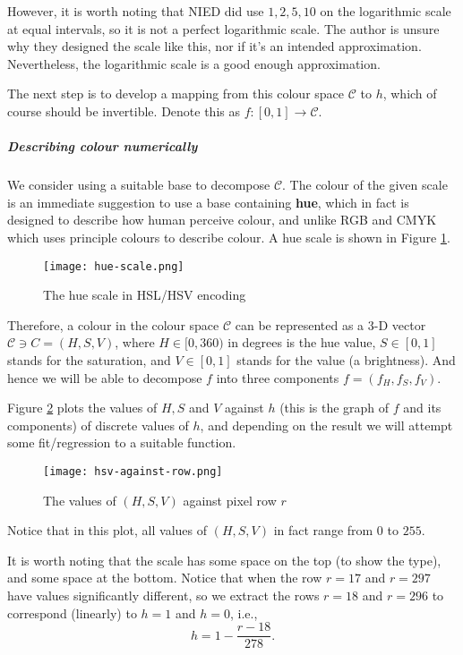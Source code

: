 However, it is worth noting that NIED did use \(1, 2, 5, 10\) on the logarithmic scale at equal intervals, so it is not a perfect logarithmic scale. The author is unsure why they designed the scale like this, nor if it's an intended approximation. Nevertheless, the logarithmic scale is a good enough approximation.

The next step is to develop a mapping from this colour space \(\mathcal{C}\) to \(h\), which of course should be invertible. Denote this as \(f: [0, 1] \to \mathcal{C}\).

\subparagraph{Describing colour numerically}

We consider using a suitable base to decompose \(\mathcal{C}\). The colour of the given scale is an immediate suggestion to use a base containing \textbf{hue}, which in fact is designed to describe how human perceive colour, and unlike RGB and CMYK which uses principle colours to describe colour. A hue scale is shown in Figure \ref{fig:hue-scale}.

\begin{figure}[!ht]
    \centering
    \texttt{[image: hue-scale.png]}
    \caption{The hue scale in HSL/HSV encoding}
    \label{fig:hue-scale}
\end{figure}

Therefore, a colour in the colour space \(\mathcal{C}\) can be represented as a 3-D vector \(\mathcal{C} \ni C = (H, S, V)\), where \(H \in [0, 360)\) in degrees is the hue value, \(S \in [0, 1]\) stands for the saturation, and \(V \in [0, 1]\) stands for the value (a brightness). And hence we will be able to decompose \(f\) into three components \(f = \left(f_H, f_S, f_V\right)\).

Figure \ref{fig:hsv-against-row} plots the values of \(H, S\) and \(V\) against \(h\) (this is the graph of \(f\) and its components) of discrete values of \(h\), and depending on the result we will attempt some fit/regression to a suitable function.

\begin{figure}[!ht]
    \centering
    \texttt{[image: hsv-against-row.png]}
    \caption{The values of \((H, S, V)\) against pixel row \(r\)}
    \label{fig:hsv-against-row}
\end{figure}

Notice that in this plot, all values of \((H, S, V)\) in fact range from \(0\) to \(255\).

It is worth noting that the scale has some space on the top (to show the type), and some space at the bottom. Notice that when the row \(r = 17\) and \(r = 297\) have values significantly different, so we extract the rows \(r = 18\) and \(r = 296\) to correspond (linearly) to \(h = 1\) and \(h = 0\), i.e.,
\[
    h = 1 - \frac{r - 18}{278}.
\]

